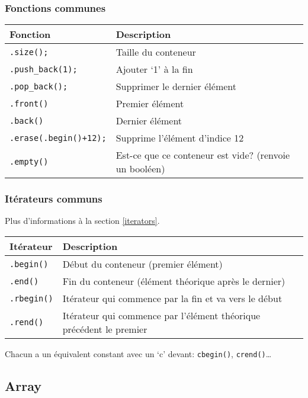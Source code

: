 \documentclass[10pt,a4paper,french]{article}
\begin{document}
\subsubsection{Fonctions communes}\label{containers-func}
\begin{tabular}{l|l}
Fonction & Description \\
\hline
\texttt{.size();} & Taille du conteneur \\
\texttt{.push_back(1);} & Ajouter `1' à la fin \\
\texttt{.pop_back();} & Supprimer le dernier élément \\
\texttt{.front()} & Premier élément \\
\texttt{.back()} & Dernier élément \\
\texttt{.erase(.begin()+12);} & Supprime l'élément d'indice 12 \\
\texttt{.empty()} & Est-ce que ce conteneur est vide? (renvoie un booléen) \\
\end{tabular}

\subsubsection{Itérateurs communs}\label{containers-iterators}

Plus d'informations à la section \cref{iterators}.

\begin{tabular}{l|l}
Itérateur & Description \\
\hline
\texttt{.begin()} & Début du conteneur (premier élément) \\
\texttt{.end()} & Fin du conteneur (élément théorique après le dernier) \\
\texttt{.rbegin()} & Itérateur qui commence par la fin et va vers le début \\
\texttt{.rend()} & Itérateur qui commence par l'élément théorique précédent le premier
\end{tabular}

Chacun a un équivalent constant avec un `c' devant: {\tt cbegin()}, {\tt crend()}\dots

\subsection{Array}

\end{document}
